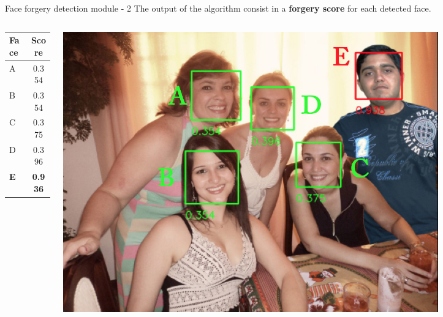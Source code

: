 \begin{tframe}{Face forgery detection module - 2}
\vspace{0.1cm}
The output of the algorithm consist in a \textbf{forgery score} for each detected face.

\vspace{0.2cm}
\begin{minipage}{\textwidth}
\begin{columns}[T]
\begin{column}{0.2\textwidth}

\vspace{1cm}
\begin{center}
\begin{table}[h!]
\centering
\begin{tabular}{l c} 
\hline \hline 
\textbf{Face} & \textbf{Score}\\ [0.5ex]
\hline
A & 0.354\\
B & 0.354\\
C &	0.375\\
D &	0.396\\
\textbf{E} & \textbf{0.936}\\[1ex]
\hline
\end{tabular}
\end{table}
\end{center}
\end{column}
\begin{column}{0.7\textwidth}
\begin{center}
\includegraphics[width=0.8\textwidth]{images/facedetectionoutput_letters.jpg}
\end{center}
\end{column}
\end{columns}
\end{minipage}


\end{tframe}



